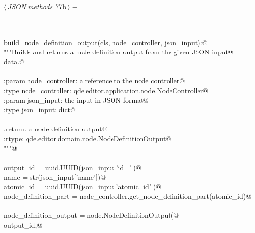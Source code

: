\documentclass[
    a4paper,      %
    10pt,         %
    openright,    %
    notitlepage,  %
    parskip=half, %
]{scrreprt}       %
\theoremstyle{definition}                    %
\begin{document}
\begin{flushleft} \small
\begin{minipage}{\linewidth}\label{scrap127}\raggedright\small
{} $\langle\,${\itshape JSON methods}\nobreak\ {\footnotesize {77b}}$\,\rangle\equiv$
\vspace{-1exm}
\begin{list}{}{} \item
\mbox{}\lstinline@@\\
\mbox{}\lstinline@classmethod@\\
\mbox{}\lstinline@def build_node_definition_output(cls, node_controller, json_input):@\\
\mbox{}\lstinline@    """Builds and returns a node definition output from the given JSON input@\\
\mbox{}\lstinline@    data.@\\
\mbox{}\lstinline@@\\
\mbox{}\lstinline@    :param node_controller: a reference to the node controller@\\
\mbox{}\lstinline@    :type  node_controller: qde.editor.application.node.NodeController@\\
\mbox{}\lstinline@    :param json_input: the input in JSON format@\\
\mbox{}\lstinline@    :type  json_input: dict@\\
\mbox{}\lstinline@@\\
\mbox{}\lstinline@    :return: a node definition output@\\
\mbox{}\lstinline@    :rtype:  qde.editor.domain.node.NodeDefinitionOutput@\\
\mbox{}\lstinline@    """@\\
\mbox{}\lstinline@@\\
\mbox{}\lstinline@    output_id             = uuid.UUID(json_input['id_'])@\\
\mbox{}\lstinline@    name                 = str(json_input['name'])@\\
\mbox{}\lstinline@    atomic_id            = uuid.UUID(json_input['atomic_id'])@\\
\mbox{}\lstinline@    node_definition_part = node_controller.get_node_definition_part(atomic_id)@\\
\mbox{}\lstinline@@\\
\mbox{}\lstinline@    node_definition_output = node.NodeDefinitionOutput(@\\
\mbox{}\lstinline@        output_id,@\\

\end{list}
\end{minipage}
\end{flushleft}
\end{document}
